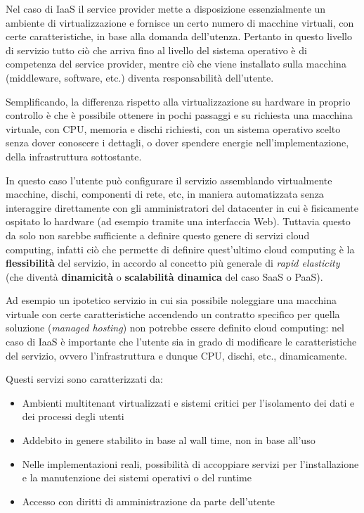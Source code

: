\documentclass[italian,]{article}
\providecommand{\tightlist}{%
  \setlength{\itemsep}{0pt}\setlength{\parskip}{0pt}}
\begin{document}
Nel caso di IaaS il service provider mette a disposizione essenzialmente
un ambiente di virtualizzazione e fornisce un certo numero di macchine
virtuali, con certe caratteristiche, in base alla domanda dell'utenza.
Pertanto in questo livello di servizio tutto ciò che arriva fino al
livello del sistema operativo è di competenza del service provider,
mentre ciò che viene installato sulla macchina (middleware, software,
etc.) diventa responsabilità dell'utente.

Semplificando, la differenza rispetto alla virtualizzazione su hardware
in proprio controllo è che è possibile ottenere in pochi passaggi e su
richiesta una macchina virtuale, con CPU, memoria e dischi richiesti,
con un sistema operativo scelto senza dover conoscere i dettagli, o
dover spendere energie nell'implementazione, della infrastruttura
sottostante.

In questo caso l'utente può configurare il servizio assemblando
virtualmente macchine, dischi, componenti di rete, etc, in maniera
automatizzata senza interaggire direttamente con gli amministratori del
datacenter in cui è fisicamente ospitato lo hardware (ad esempio tramite
una interfaccia Web). Tuttavia questo da solo non sarebbe sufficiente a
definire questo genere di servizi cloud computing, infatti ciò che
permette di definire quest'ultimo cloud computing è la
\textbf{flessibilità} del servizio, in accordo al concetto più generale
di \emph{rapid elasticity} (che diventà \textbf{dinamicità} o
\textbf{scalabilità dinamica} del caso SaaS o PaaS).

Ad esempio un ipotetico servizio in cui sia possibile noleggiare una
macchina virtuale con certe caratteristiche accendendo un contratto
specifico per quella soluzione (\emph{managed hosting}) non potrebbe
essere definito cloud computing: nel caso di IaaS è importante che
l'utente sia in grado di modificare le caratteristiche del servizio,
ovvero l'infrastruttura e dunque CPU, dischi, etc., dinamicamente.

Questi servizi sono caratterizzati da:

\begin{itemize}
\tightlist
\item
  Ambienti multitenant virtualizzati e sistemi critici per l'isolamento
  dei dati e dei processi degli utenti
\item
  Addebito in genere stabilito in base al wall time, non in base all'uso
\item
  Nelle implementazioni reali, possibilità di accoppiare servizi per
  l'installazione e la manutenzione dei sistemi operativi o del runtime
\item
  Accesso con diritti di amministrazione da parte dell'utente
\end{itemize}
\end{document}
